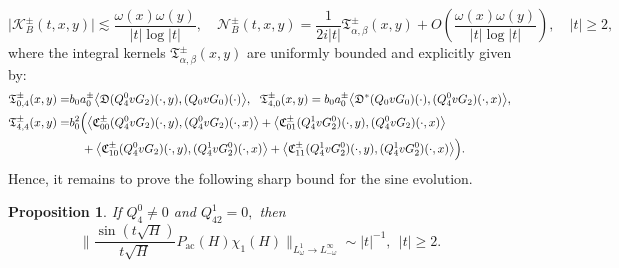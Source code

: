 \documentclass[reqno]{amsart}
\newtheorem{proposition}[theorem]{Proposition}
\numberwithin{equation}{section}
\begin{document}
\[
\bigl|\mathcal{K}_{B}^\pm(t,x,y)\bigr| \lesssim \frac{\omega(x)\omega(y)}{|t|\log|t|}, \quad
\mathcal{N}_{B}^\pm(t,x,y) = \frac{1}{2 i |t|} \mathfrak{T}^\pm_{\alpha,\beta}(x,y) + O\!\left(\frac{\omega(x)\omega(y)}{|t|\log|t|}\right), \quad |t| \ge 2,
\]
where the integral kernels $\mathfrak{T}^\pm_{\alpha,\beta}(x,y)$ are uniformly bounded and explicitly given by:   
\begin{equation}  \label{sharp-operator}
	\begin{split}
	\mathfrak{T}^\pm_{0,4}(x,y) =& b_0a_0^\pm \bigl\langle  \mathfrak{D} (Q_{4}^0 v G_2)(\cdot,y), (Q_0v G_0)(\cdot) \bigr\rangle, \ \  
	\mathfrak{T}^\pm_{4,0}(x,y)= b_0a_0^\pm \bigl\langle  \mathfrak{D}^*(Q_0v G_0)(\cdot), (Q_{4}^0v G_2)(\cdot,x) \bigr\rangle,\\
		\mathfrak{T}^\pm_{4,4}(x,y)= &b_0^2 \Bigl(\bigl\langle \mathfrak{C}_{00}^\pm (Q_{4}^0 v G_2)(\cdot,y), (Q_{4}^0 v G_2)(\cdot,x) \bigr\rangle+\bigl\langle \mathfrak{C}_{01}^\pm (Q_{4}^1 v G_2^0)(\cdot,y), (Q_{4}^0 v G_2)(\cdot,x) \bigr\rangle\\
		&\ \ \ +\bigl\langle \mathfrak{C}_{10}^\pm (Q_{4}^0 v G_2)(\cdot,y), (Q_{4}^1 v G^0_2)(\cdot,x) \bigr\rangle+\bigl\langle \mathfrak{C}_{11}^\pm (Q_{4}^1 v G_2^0)(\cdot,y), (Q_{4}^1 v G^0_2)(\cdot,x) \bigr\rangle\Bigr).  
	\end{split}
\end{equation}  
Hence, 
it remains to prove the following sharp bound for the sine evolution.
\begin{proposition}\label{2-sine-sharp-2}
	If $Q_4^0\neq 0$  and $Q_{42}^1=0,$ then
	\begin{equation*}
		\Big\|\frac{\sin (t \sqrt{H})}{t\sqrt{H}} P_{\mathrm{ac}}(H)\chi_1(H)\Big\|_{L^1_\omega \to L^{\infty}_{-\omega}} \sim |t|^{-1},\ \ |t|\ge 2.
	\end{equation*}  
\end{proposition}
\end{document}
